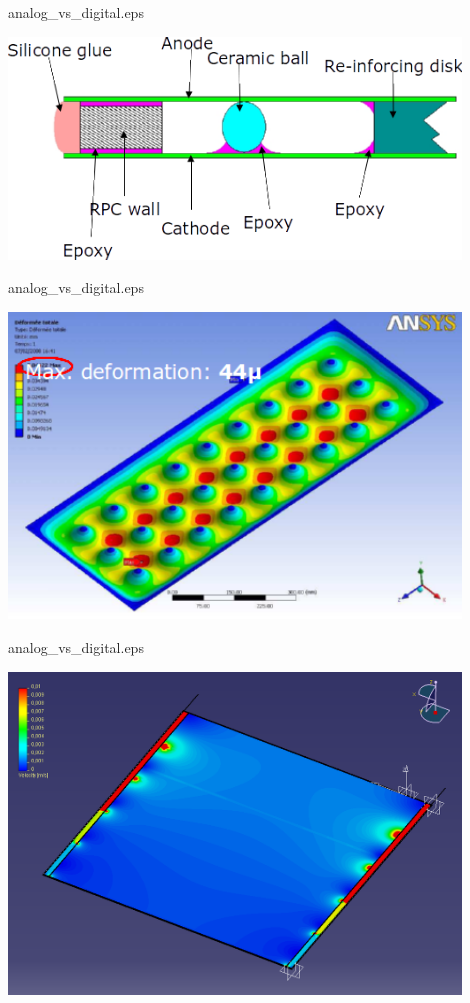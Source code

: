 \documentclass[10pt]{beamer}
\begin{document}
\begin{frame}{analog\_vs\_digital.eps}
    \centerline{\includegraphics[width=0.9\textwidth]{images/RPCSchema}}
\end{frame}
\begin{frame}{analog\_vs\_digital.eps}
    \centerline{\includegraphics[width=0.9\textwidth]{images/DeformationStudies}}
\end{frame}
\begin{frame}{analog\_vs\_digital.eps}
    \centerline{\includegraphics[width=0.9\textwidth]{images/GasFlow}}
\end{frame}
\end{document}
